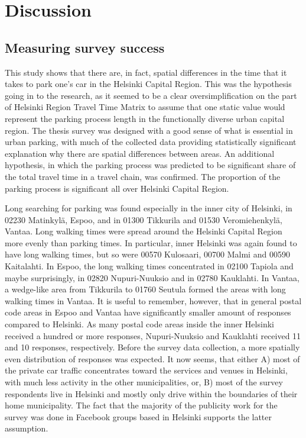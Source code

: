 \section{Discussion}
\subsection{Measuring survey success}
\justify

This study shows that there are, in fact, spatial differences in the time that it takes to park one's car in the Helsinki Capital Region. This was the hypothesis going in to the research, as it seemed to be a clear oversimplification on the part of Helsinki Region Travel Time Matrix to assume that one static value would represent the parking process length in the functionally diverse urban capital region. The thesis survey was designed with a good sense of what is essential in urban parking, with much of the collected data providing statistically significant explanation why there are spatial differences between areas. An additional hypothesis, in which the parking process was predicted to be significant share of the total travel time in a travel chain, was confirmed. The proportion of the parking process is significant all over Helsinki Capital Region.

Long searching for parking was found especially in the inner city of Helsinki, in 02230 Matinkylä, Espoo, and in 01300 Tikkurila and  01530 Veromiehenkylä, Vantaa. Long walking times were spread around the Helsinki Capital Region more evenly than parking times. In particular, inner Helsinki was again found to have long walking times, but so were 00570 Kulosaari, 00700 Malmi and 00590 Kaitalahti. In Espoo, the long walking times concentrated in 02100 Tapiola and maybe surprisingly, in 02820 Nupuri-Nuuksio and in 02780 Kauklahti. In Vantaa, a wedge-like area from Tikkurila to 01760 Seutula formed the areas with long walking times in Vantaa. It is useful to remember, however, that in general postal code areas in Espoo and Vantaa have significantly smaller amount of responses compared to Helsinki. As many postal code areas inside the inner Helsinki received a hundred or more responses, Nupuri-Nuuksio and Kauklahti received 11 and 10 responses, respectively. Before the survey data collection, a more spatially even distribution of responses was expected. It now seems, that either A) most of the private car traffic concentrates toward the services and venues in Helsinki, with much less activity in the other municipalities, or, B) most of the survey respondents live in Helsinki and mostly only drive within the boundaries of their home municipality. The fact that the majority of the publicity work for the survey was done in Facebook groups based in Helsinki supports the latter assumption.

